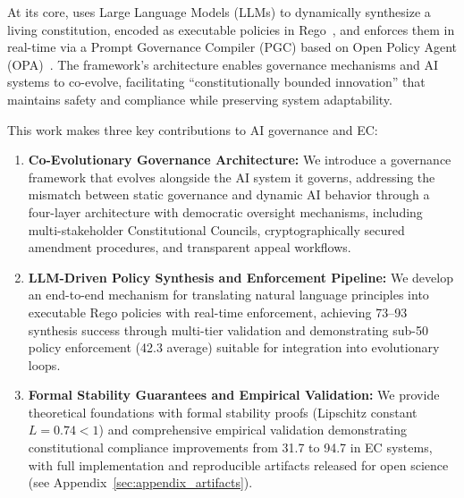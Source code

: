 At its core, \acgs{} uses Large Language Models (LLMs) to dynamically synthesize a living constitution, encoded as executable policies in Rego~\cite{rego2019}, and enforces them in real-time via a Prompt Governance Compiler (PGC) based on Open Policy Agent (OPA)~\cite{opa2023}. The framework's architecture enables governance mechanisms and AI systems to co-evolve, facilitating ``constitutionally bounded innovation'' that maintains safety and compliance while preserving system adaptability.

This work makes three key contributions to AI governance and EC\@:
\begin{enumerate}[leftmargin=*,topsep=2pt,itemsep=2pt,parsep=0pt]
    \item \textbf{Co-Evolutionary Governance Architecture:} We introduce a governance framework that evolves alongside the AI system it governs, addressing the mismatch between static governance and dynamic AI behavior through a four-layer architecture with democratic oversight mechanisms, including multi-stakeholder Constitutional Councils, cryptographically secured amendment procedures, and transparent appeal workflows.
    \item \textbf{LLM-Driven Policy Synthesis and Enforcement Pipeline:} We develop an end-to-end mechanism for translating natural language principles into executable Rego policies with real-time enforcement, achieving 73--93\percent{} synthesis success through multi-tier validation and demonstrating sub-50\ms{} policy enforcement (42.3\ms{} average) suitable for integration into evolutionary loops.
    \item \textbf{Formal Stability Guarantees and Empirical Validation:} We provide theoretical foundations with formal stability proofs (Lipschitz constant $L = 0.74 < 1$) and comprehensive empirical validation demonstrating constitutional compliance improvements from 31.7\percent{} to 94.7\percent{} in EC systems, with full implementation and reproducible artifacts released for open science (see Appendix~\ref{sec:appendix_artifacts}).
\end{enumerate}

